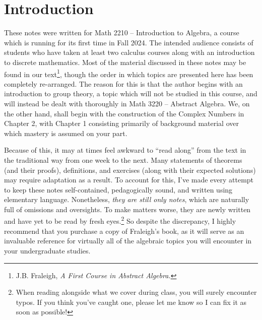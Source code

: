 \documentclass[11pt,fleqn,dvipsnames,usenames]{article}
\renewcommand{\headrulewidth}{1pt}
\newcommand{\p}{\noindent}
\begin{document}
\fancyhead[R]{\term}
\renewcommand{\headrulewidth}{0.4pt}


\setcounter{section}{0}

\section*{Introduction}

\p These notes were written for Math 2210 -- Introduction to Algebra, a course which is running for its first time in Fall 2024.  The intended audience consists of students who have taken at least two calculus courses along with an introduction to discrete mathematics.  Most of the material discussed in these notes may be found in our text\footnote{J.B. Fraleigh, \emph{A First Course in Abstract Algebra.}}, though the order in which topics are presented here has been completely re-arranged.  The reason for this is that the author begins with an introduction to group theory, a topic which will not be studied in this course, and will instead be dealt with thoroughly in Math 3220 -- Abstract Algebra.  We, on the other hand, shall begin with the construction of the Complex Numbers in Chapter 2, with Chapter 1 consisting primarily of background material over which mastery is assumed on your part.
\vsp

\p Because of this, it may at times feel awkward to ``read along'' from the text in the traditional way from one week to the next.  Many statements of theorems (and their proofs), definitions, and exercises (along with their expected solutions) may require adaptation as a result.  To account for this, I've made every attempt to keep these notes self-contained, pedagogically sound, and written using elementary language.  Nonetheless, \emph{they are still only notes}, which are naturally full of omissions and oversights.  To make matters worse, they are newly written and have yet to be read by fresh eyes.\footnote{When reading alongside what we cover during class, you will surely encounter typos.  If you think you've caught one, please let me know so I can fix it as soon as possible!}  So despite the discrepancy, I highly recommend that you purchase a copy of Fraleigh's book, as it will serve as an invaluable reference for virtually all of the algebraic topics you will encounter in your undergraduate studies.
\vsp
\end{document}
